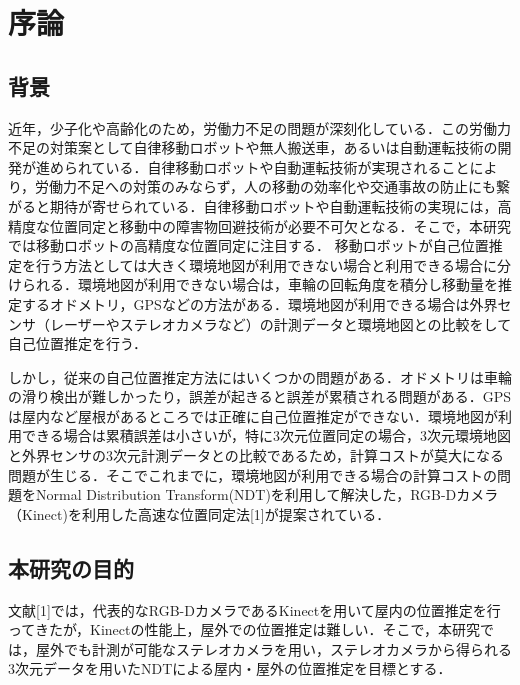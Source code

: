 \chapter{序論} 
\section{背景}
近年，少子化や高齢化のため，労働力不足の問題が深刻化している．この労働力不足の対策案として自律移動ロボットや無人搬送車，あるいは自動運転技術の開発が進められている．自律移動ロボットや自動運転技術が実現されることにより，労働力不足への対策のみならず，人の移動の効率化や交通事故の防止にも繋がると期待が寄せられている．自律移動ロボットや自動運転技術の実現には，高精度な位置同定と移動中の障害物回避技術が必要不可欠となる．そこで，本研究では移動ロボットの高精度な位置同定に注目する．
移動ロボットが自己位置推定を行う方法としては大きく環境地図が利用できない場合と利用できる場合に分けられる．環境地図が利用できない場合は，車輪の回転角度を積分し移動量を推定するオドメトリ，GPSなどの方法がある．環境地図が利用できる場合は外界センサ（レーザーやステレオカメラなど）の計測データと環境地図との比較をして自己位置推定を行う．

しかし，従来の自己位置推定方法にはいくつかの問題がある．オドメトリは車輪の滑り検出が難しかったり，誤差が起きると誤差が累積される問題がある．GPSは屋内など屋根があるところでは正確に自己位置推定ができない．環境地図が利用できる場合は累積誤差は小さいが，特に3次元位置同定の場合，3次元環境地図と外界センサの3次元計測データとの比較であるため，計算コストが莫大になる問題が生じる．そこでこれまでに，環境地図が利用できる場合の計算コストの問題をNormal Distribution Transform(NDT)を利用して解決した，RGB-Dカメラ（Kinect)を利用した高速な位置同定法[1]が提案されている．

\newpage
\section{本研究の目的}

文献[1]では，代表的なRGB-DカメラであるKinectを用いて屋内の位置推定を行ってきたが，Kinectの性能上，屋外での位置推定は難しい．そこで，本研究では，屋外でも計測が可能なステレオカメラを用い，ステレオカメラから得られる3次元データを用いたNDTによる屋内・屋外の位置推定を目標とする．
